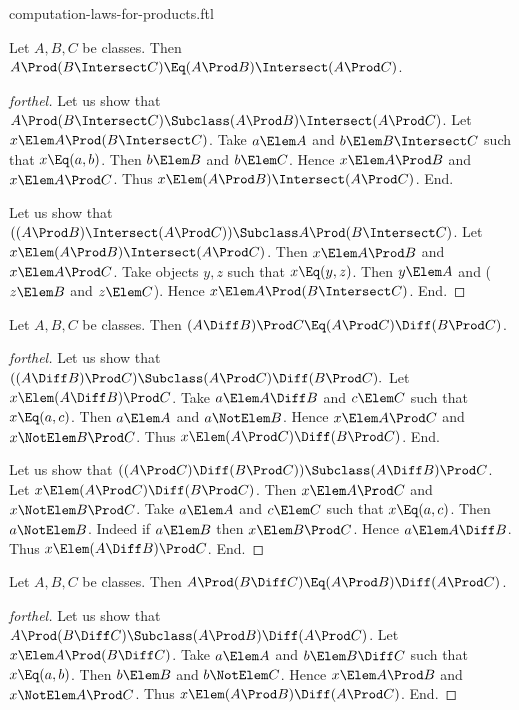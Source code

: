 \documentclass{stex}
\begin{document}
\begin{smodule}{computation-laws-for-products.ftl}
\begin{proposition*}[forthel]
  Let $A, B, C$ be classes.
  Then $A \Prod (B \Intersect C) \Eq (A \Prod B) \Intersect (A \Prod C)$.
\end{proposition*}
\begin{proof}[forthel]
  Let us show that $A \Prod (B \Intersect C) \Subclass (A \Prod B) \Intersect (A \Prod C)$.
    Let $x \Elem A \Prod (B \Intersect C)$.
    Take $a \Elem A$ and $b \Elem B \Intersect C$ such that $x \Eq (a, b)$.
    Then $b \Elem B$ and $b \Elem C$.
    Hence $x \Elem A \Prod B$ and $x \Elem A \Prod C$.
    Thus $x \Elem (A \Prod B) \Intersect (A \Prod C)$.
  End.

  Let us show that $((A \Prod B) \Intersect (A \Prod C)) \Subclass A \Prod (B \Intersect C)$. %
    Let $x \Elem (A \Prod B) \Intersect (A \Prod C)$.
    Then $x \Elem A \Prod B$ and $x \Elem A \Prod C$.
    Take objects $y, z$ such that $x \Eq (y, z)$.
    Then $y \Elem A$ and ($z \Elem B$ and $z \Elem C$).
    Hence $x \Elem A \Prod (B \Intersect C)$.
  End.
\end{proof}

\begin{proposition*}[forthel]
  Let $A, B, C$ be classes.
  Then $(A \Diff B) \Prod C \Eq (A \Prod C) \Diff (B \Prod C)$.
\end{proposition*}
\begin{proof}[forthel]
  Let us show that $((A \Diff B) \Prod C) \Subclass (A \Prod C) \Diff (B \Prod C).$ %
    Let $x \Elem (A \Diff B) \Prod C$.
    Take $a \Elem A \Diff B$ and $c \Elem C$ such that $x \Eq (a, c)$.
    Then $a \Elem A$ and $a \NotElem B$.
    Hence $x \Elem A \Prod C$ and $x \NotElem B \Prod C$.
    Thus $x \Elem (A \Prod C) \Diff (B \Prod C)$.
  End.

  Let us show that $((A \Prod C) \Diff (B \Prod C)) \Subclass (A \Diff B) \Prod C$. %
    Let $x \Elem (A \Prod C) \Diff (B \Prod C)$.
    Then $x \Elem A \Prod C$ and $x \NotElem B \Prod C$.
    Take $a \Elem A$ and $c \Elem C$ such that $x \Eq (a, c)$.
    Then $a \NotElem B$.
    Indeed if $a \Elem B$ then $x \Elem B \Prod C$.
    Hence $a \Elem A \Diff B$.
    Thus $x \Elem (A \Diff B) \Prod C$.
  End.
\end{proof}

\begin{proposition*}[forthel]
  Let $A, B, C$ be classes.
  Then $A \Prod (B \Diff C) \Eq (A \Prod B) \Diff (A \Prod C)$.
\end{proposition*}
\begin{proof}[forthel]
  Let us show that $A \Prod (B \Diff C) \Subclass (A \Prod B) \Diff (A \Prod C)$.
    Let $x \Elem A \Prod (B \Diff C)$.
    Take $a \Elem A$ and $b \Elem B \Diff C$ such that $x \Eq (a, b)$.
    Then $b \Elem B$ and $b \NotElem C$.
    Hence $x \Elem A \Prod B$ and $x \NotElem A \Prod C$.
    Thus $x \Elem (A \Prod B) \Diff (A \Prod C)$.
  End.


\end{proof}
\end{smodule}
\end{document}
